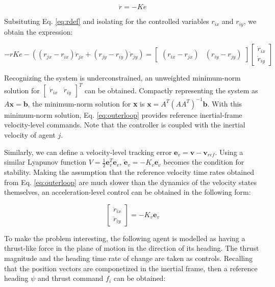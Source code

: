 \documentclass{aiaa-tc}
\newcommand{\B}[1]{\textbf{#1}} %
\begin{document}
\begin{equation}
\dot{r} = -Ke
\end{equation}

Subsituting Eq. \ref{eq:rdef} and isolating for the controlled variables $r_{ix}$ and $r_{iy}$, we obtain the expression:

\begin{equation}
-rKe - ((r_{jx}-r_{ix})\dot{r}_{jx} + (r_{jy} - r_{iy})\dot{r}_{jy}) = \begin{bmatrix}
(r_{ix}-r_{jx}) & (r_{iy}-r_{jy})
\end{bmatrix}
\begin{bmatrix}
\dot{r}_{ix} \\
\dot{r}_{iy}
\end{bmatrix}
\label{eq:outerloop}
\end{equation}

Recognizing the system is underconstrained, an unweighted minimum-norm solution for $\begin{bmatrix}
\dot{r}_{ix} &
\dot{r}_{iy}
\end{bmatrix}^T$ can be obtained. Compactly representing the system as $A\B{x} = \B{b}$, the minimum-norm solution for \B{x} is $\B{x} = A^T(AA^T)^{-1}\B{b}$. With this minimum-norm solution, Eq. \ref{eq:outerloop} provides reference inertial-frame velocity-level commands. Note that the controller is coupled with the inertial velocity of agent $j$.

Similarly, we can define a velocity-level tracking error $\B{e}_v = \B{v} - \B{v}_{ref}$. Using a similar Lyapunov function $V = \frac{1}{2} \B{e}_v^T \B{e}_v$, $\dot{\B{e}}_v = -K_v \B{e}_v$ becomes the condition for stability. Making the assumption that the reference velocity time rates obtained from Eq. \ref{eq:outerloop} are much slower than the dynamics of the velocity states themselves, an acceleration-level control can be obtained in the following form:

\begin{equation}
\begin{bmatrix}
\ddot{r}_{ix} \\
\ddot{r}_{iy}
\end{bmatrix} = -K_v \B{e}_v
\end{equation}

To make the problem interesting, the following agent is modelled as having a thrust-like force in the plane of motion in the direction of its heading. The thrust magnitude and the heading time rate of change are taken as controls. Recalling that the position vectors are componetized in the inertial frame, then a reference heading $\psi$ and thrust command $f_i$ can be obtained:
\end{document}
